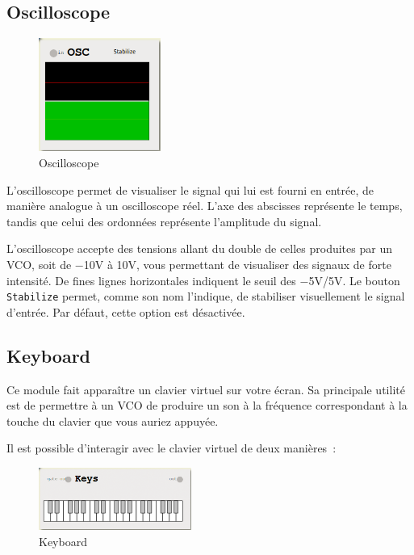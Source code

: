 \documentclass[a4paper,oneside,frenchb,10pt]{article}
\begin{document}
\subsection{Oscilloscope}

\begin{multicols}{2}
\begin{figure}[H]
\centering
\includegraphics[width=4cm]{../img/png/oscilloscope.png}
\caption{Oscilloscope}
\end{figure}

L'oscilloscope permet de visualiser le signal qui lui est fourni en
entrée, de manière analogue à un oscilloscope réel. L'axe des abscisses
représente le temps, tandis que celui des ordonnées représente
l'amplitude du signal.

L'oscilloscope accepte des tensions allant du double de celles produites
par un VCO, soit de −10V à 10V, vous permettant de visualiser des
signaux de forte intensité. De fines lignes horizontales indiquent le seuil
des $-$5V/5V. Le bouton \verb!Stabilize! permet, comme son nom l'indique, de
stabiliser visuellement le signal d'entrée. Par défaut, cette option est
désactivée.
\end{multicols}

\subsection{Keyboard}

\begin{multicols}{2}
Ce module fait apparaître un clavier virtuel sur votre écran. Sa
principale utilité est de permettre à un VCO de produire un son à la
fréquence correspondant à la touche du clavier que vous auriez appuyée.

Il est possible d'interagir avec le clavier virtuel de deux manières~:

\begin{figure}[H]
\centering
\includegraphics[width=5cm]{../img/png/keyboard.png}
\caption{Keyboard}
\end{figure}
\end{multicols}
\end{document}
